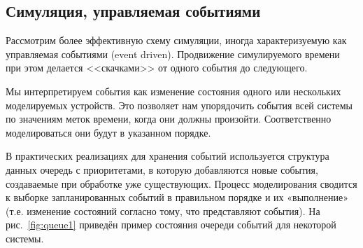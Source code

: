 \subsection{Симуляция, управляемая событиями}

Рассмотрим более эффективную схему симуляции, иногда характеризуемую как управляемая событиями (\abbr event driven). Продвижение симулируемого времени при этом делается <<скачками>> от одного события до следующего.

Мы интерпретируем события как изменение состояния одного или нескольких моделируемых устройств. Это позволяет нам упорядочить события всей системы по значениям меток времени, когда они должны произойти. Соответственно моделироваться они будут в указанном порядке. 

В практических реализациях для хранения событий используется структура данных очередь с приоритетами, в которую добавляются новые события, создаваемые при обработке уже существующих. Процесс моделирования сводится к выборке запланированных событий в правильном порядке и их «выполнение» (т.е. изменение состояний согласно тому, что представляют события). На рис.~\ref{fig:queue1} приведён пример состояния очереди событий для некоторой системы.  

